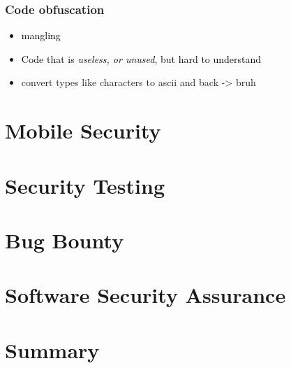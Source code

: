 \documentclass[main.tex,fontsize=8pt,paper=a4,paper=portrait,DIV=calc,]{scrartcl}
\begin{document}
\subsubsection{Code obfuscation}
\begin{itemize}
\item \textcolor{black}{mangling}
\item \textcolor{black}{Code that is \emph{useless, or unused}, but hard to understand}
\item convert types like characters to ascii and back -> bruh
\end{itemize} 

\section{Mobile Security}

\section{Security Testing}

\section{Bug Bounty}

\section{Software Security Assurance}

\section{Summary}
\end{document}
